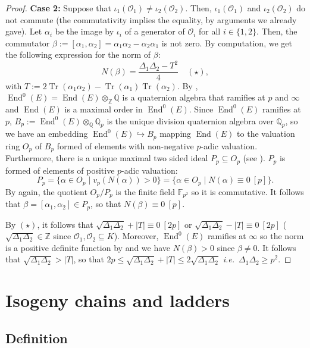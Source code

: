 \documentclass[a4paper,10pt]{report}
\theoremstyle{definition}
\theoremstyle{plain}
\theoremstyle{definition}
\newcommand{\ie}{\emph{i.e.}\ }
\newcommand{\Z}{\mathbb{Z}}
\newcommand{\Q}{\mathbb{Q}}
\newcommand{\F}{\mathbb{F}}
\newcommand{\mO}{\mathcal{O}}
\renewcommand{\(}{\left(}
\renewcommand{\)}{\right)}
\DeclareMathOperator{\End}{End}
\DeclareMathOperator{\Tr}{Tr}
\begin{document}
\begin{proof}
\textbf{Case 2:} Suppose that $\iota_1(\mO_1)\neq\iota_2(\mO_2)$. Then, $\iota_1(\mO_1)$ and $\iota_2(\mO_2)$ do not commute (the commutativity implies the equality, by arguments we already gave).  Let $\alpha_i$ be the image by $\iota_i$ of a generator of $\mO_i$ for all $i\in\{1,2\}$. Then, the commutator $\beta:=[\alpha_1,\alpha_2]=\alpha_1\alpha_2-\alpha_2\alpha_1$ is not zero.  By computation, we get the following expression for the norm of $\beta$:
\[N(\beta)=\frac{\Delta_1\Delta_2-T^2}{4}\quad (\star),\]
with $T:=2\Tr(\alpha_1\alpha_2)-\Tr(\alpha_1)\Tr(\alpha_2)$. By \cite[Theorem 42.1.19]{Voight}, $\End^0(E)=\End(E)\otimes_\Z \Q$ is a quaternion algebra that ramifies at $p$ and $\infty$ and $\End(E)$ is a maximal order in $\End^0(E)$. Since $\End^0(E)$ ramifies at $p$, $B_p:=\End^0(E)\otimes_\Q\Q_p$ is the unique division quaternion algebra over $\Q_p$, so we have an embedding $\End^0(E)\hookrightarrow B_p$ mapping $\End(E)$ to the valuation ring $O_p$ of $B_p$ formed of elements with non-negative $p$-adic valuation.  Furthermore, there is a unique maximal two sided ideal $P_p\subseteq O_p$ (see \cite[Theorem 13.3.11]{Voight}). $P_p$ is formed of elements of positive $p$-adic valuation:
\[P_p=\{\alpha\in O_p\mid v_p(N(\alpha))>0\}=\{\alpha\in O_p\mid N(\alpha)\equiv 0 \ [p]\}.\]
By \cite[Theorem 13.3.11.(b)]{Voight} again, the quotient $O_p/P_p$ is the finite field $\F_{p^2}$ so it is commutative. It follows that $\beta=[\alpha_1,\alpha_2]\in P_p$, so that $N(\beta)\equiv 0 \ [p]$. 

By $(\star)$, it follows that $\sqrt{\Delta_1\Delta_2}+|T|\equiv 0 \ [2p]$ or $\sqrt{\Delta_1\Delta_2}-|T|\equiv 0 \ [2p]$ ($\sqrt{\Delta_1\Delta_2}\in\Z$ since $\mO_1,\mO_2\subseteq K$). Moreover, $\End^0(E)$ ramifies at $\infty$ so the norm is a positive definite function by \cite[Exercise 2.4]{Voight} and we have $N(\beta)>0$ since $\beta\neq 0$. It follows that $\sqrt{\Delta_1\Delta_2}>|T|$, so that $2p\leq\sqrt{\Delta_1\Delta_2}+|T|\leq 2\sqrt{\Delta_1\Delta_2}$ \ie  $\Delta_1\Delta_2\geq p^2$.
\end{proof}

\section{Isogeny chains and ladders}

\subsection{Definition}
\end{document}

